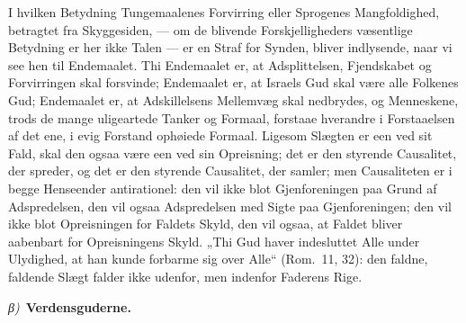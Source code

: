 \documentclass[12pt]{book}
\newcommand{\greekrun}[2]{%
  \medskip\begin{center}{\itshape #1)}\ {\bfseries #2}\end{center}\medskip}
\begin{document}
I hvilken Betydning Tungemaalenes Forvirring eller Sprogenes
Mangfoldighed, betragtet fra Skyggesiden, --- om de blivende
Forskjelligheders væsentlige Betydning er her ikke Talen --- er en
Straf for Synden, bliver indlysende, naar vi see hen til
Endemaalet. Thi Endemaalet er, at Adsplittelsen, Fjendskabet og
Forvirringen skal forsvinde; Endemaalet er, at Israels Gud skal være
alle Folkenes Gud; Endemaalet er, at Adskillelsens Mellemvæg skal
nedbrydes, og Menneskene, trods de mange uligeartede Tanker og
Formaal, forstaae hverandre i Forstaaelsen af det ene, i evig
Forstand ophøiede Formaal. Ligesom Slægten er een ved sit Fald, skal
den ogsaa
være een ved sin Opreisning; det er den styrende Causalitet, der
spreder, og det er den styrende Causalitet, der samler; men
Causaliteten er i begge Henseender antirationel: den vil ikke blot
Gjenforeningen paa Grund af Adspredelsen, den vil ogsaa Adspredelsen
med Sigte paa Gjenforeningen; den vil ikke blot Opreisningen for
Faldets Skyld, den vil ogsaa, at Faldet bliver aabenbart for
Opreisningens Skyld. „Thi Gud haver indesluttet Alle under
Ulydighed, at han kunde forbarme sig over Alle“ (Rom.\ 11, 32): den
faldne, faldende Slægt falder ikke udenfor, men indenfor Faderens
Rige.

\greekrun{β}{Verdensguderne.}
\end{document}
